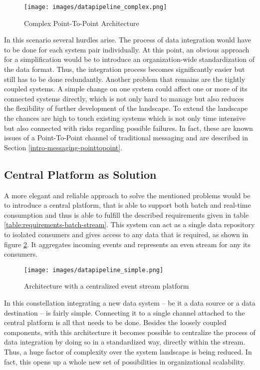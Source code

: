 \begin{figure}[H]
    \centering
    \texttt{[image: images/datapipeline\_complex.png]}
    \caption{Complex Point-To-Point Architecture}
    \label{fig:datapipeline_complex}
\end{figure}

In this scenario several hurdles arise. The process of data integration would
have to be done for each system pair individually. At this point, an obvious
approach for a simplification would be to introduce an organization-wide
standardization of the data format. Thus, the integration process becomes 
significantly easier but still has to be done redundantly. Another problem that
remains are the tightly coupled systems. A simple change on one system could
affect one or more of its connected systems directly, which is not only hard to
manage but also reduces the flexibility of further development of the landscape.
To extend the landscape the chances are high to touch existing systems which is
not only time intensive but also connected with risks regarding possible
failures. In fact, these are known issues of a Point-To-Point channel of
traditional messaging and are described in Section
\ref{intro-messaging-pointtopoint}.

\subsection{Central Platform as Solution}
\label{intro-datastream-centralplatform}
A more elegant and reliable approach to solve the mentioned problems would be to
introduce a central platform, that is able to support both batch and real-time
consumption and thus is able to fulfill the described requirements given in table
\ref{table:requirements-batch-stream}. This system can act as a single
data repository to isolated consumers and gives access to any data that is
required, as shown in figure \ref{fig:datapipeline_simple}. It aggregates
incoming events and represents an even stream for any its consumers. 

\begin{figure}[H]
    \centering
    \texttt{[image: images/datapipeline\_simple.png]}
    \caption{Architecture with a centralized event stream platform}
    \label{fig:datapipeline_simple}
\end{figure}

In this constellation integrating a new data system -- be it a data
source or a data destination -- is fairly simple. Connecting it to a single
channel attached to the central platform is all that needs to be done. Besides the
loosely coupled components, with this architecture it becomes possible to
centralize the process of data integration by doing so in a standardized way,
directly within the stream. Thus, a huge factor of complexity over the system
landscape is being reduced. In fact, this opens up a whole new set of
possibilities in organizational scalability. 

